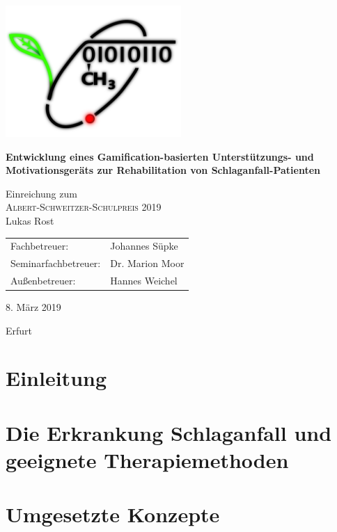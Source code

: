 \documentclass[a4paper, 11pt, titlepage, bibliography=totocnumbered]{scrartcl}
\begin{document}
\begin{titlepage}
	\centering
	\includegraphics[width=0.5\textwidth]{pics/logo}\par\vspace{1cm}
	{\huge\bfseries Entwicklung eines Gamification-basierten Unterstützungs- und Motivationsgeräts zur Rehabilitation von Schlaganfall-Patienten\par}
	\vspace{2cm}
	{\Large Einreichung zum \\ \textsc{Albert-Schweitzer-Schulpreis 2019} \\}
	\vspace{2cm}
	{\Large Lukas Rost}
	\vfill
	{\begin{tabular}{ll}
	\Large Fachbetreuer: & \Large Johannes Süpke \\[5pt]
	\Large Seminarfachbetreuer: & \Large Dr. Marion Moor \\[5pt]
	\Large Außenbetreuer: & \Large Hannes Weichel \\
	\end{tabular}}
	\vfill
	{\Large 8. März 2019\par Erfurt}
\end{titlepage}

\newpage

\tableofcontents
\setcounter{page}{1}
\newpage

\section{Einleitung}


\newpage
\section{Die Erkrankung Schlaganfall und geeignete Therapiemethoden}


\newpage
\section{Umgesetzte Konzepte}

\end{document}
